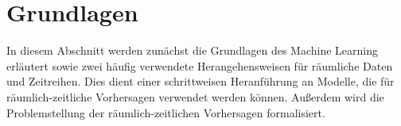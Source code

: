 \section{Grundlagen}
\label{sec:Grundlagen}

In diesem Abschnitt werden zunächst die Grundlagen des Machine Learning erläutert sowie zwei häufig verwendete Herangehensweisen für räumliche Daten und Zeitreihen.
Dies dient einer schrittweisen Heranführung an Modelle, die für räumlich-zeitliche Vorhersagen verwendet werden können.
Außerdem wird die Problemstellung der räumlich-zeitlichen Vorhersagen formalisiert.







%
